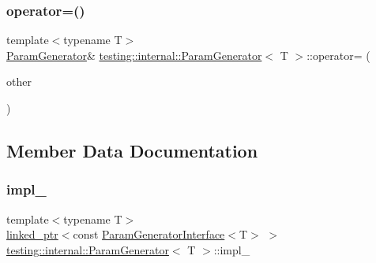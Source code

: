 \mbox{\label{classtesting_1_1internal_1_1_param_generator_a590a03c6e0a3a3ac6279943ad1f01dc8}} 
\subsubsection{\texorpdfstring{operator=()}{operator=()}\hspace{0.1cm}{\footnotesize\ttfamily [3/3]}}
{\footnotesize\ttfamily template$<$typename T$>$ \\
\mbox{\hyperlink{classtesting_1_1internal_1_1_param_generator}{Param\+Generator}}\& \mbox{\hyperlink{classtesting_1_1internal_1_1_param_generator}{testing\+::internal\+::\+Param\+Generator}}$<$ T $>$\+::operator= (\begin{DoxyParamCaption}\item[{const \mbox{\hyperlink{classtesting_1_1internal_1_1_param_generator}{Param\+Generator}}$<$ T $>$ \&}]{other }\end{DoxyParamCaption})\hspace{0.3cm}{\ttfamily [inline]}}



\subsection{Member Data Documentation}
\mbox{\label{classtesting_1_1internal_1_1_param_generator_a73861e909649bbce3f61c64878c52d9f}} 
\subsubsection{\texorpdfstring{impl\_}{impl\_}\hspace{0.1cm}{\footnotesize\ttfamily [1/2]}}
{\footnotesize\ttfamily template$<$typename T$>$ \\
\mbox{\hyperlink{classtesting_1_1internal_1_1linked__ptr}{linked\+\_\+ptr}}$<$const \mbox{\hyperlink{classtesting_1_1internal_1_1_param_generator_interface}{Param\+Generator\+Interface}}$<$T$>$ $>$ \mbox{\hyperlink{classtesting_1_1internal_1_1_param_generator}{testing\+::internal\+::\+Param\+Generator}}$<$ T $>$\+::impl\+\_\+\hspace{0.3cm}{\ttfamily [private]}}

